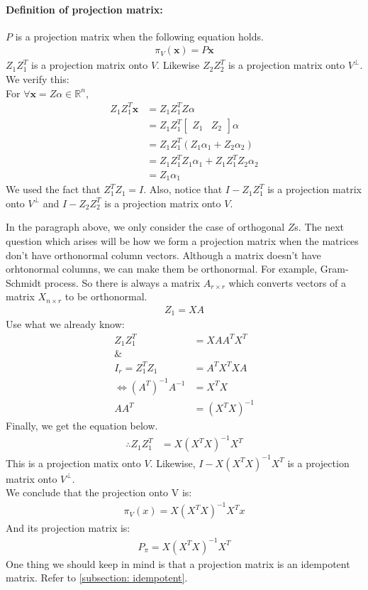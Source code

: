 \documentclass{article}
\begin{document}
\paragraph{Definition of projection matrix:} \(P\) is a projection matrix when the following equation holds. 
\begin{align*}
\pi_V(\mathbf{x})=P\mathbf{x}
\end{align*}
\(Z_1Z_1^T\) is a projection matrix onto \(V\). Likewise \(Z_2Z_2^T\) is a projection matrix onto \(V^\perp\). We verify this:\\
For \(\forall \mathbf{x} = Z\alpha \in \mathbb{R}^n\),
\begin{align*}
Z_1Z_1^T\mathbf{x}&=Z_1Z_1^TZ\alpha\\
&=Z_1Z_1^T\left[\begin{matrix}Z_1 & Z_2\end{matrix}\right]\alpha\\
&=Z_1Z_1^T\left(Z_1\alpha_1+ Z_2\alpha_2\right)\\
&=Z_1Z_1^TZ_1\alpha_1 + Z_1Z_1^TZ_2\alpha_2\\
&=Z_1\alpha_1
\end{align*}
We used the fact that \(Z_1^TZ_1=I\). Also, notice that \(I-Z_1Z_1^T\) is a projection matrix onto \(V^\perp\) and \(I-Z_2Z_2^T\) is a projection matrix onto \(V\).

In the paragraph above, we only consider the case of orthogonal \(Z\)s. The next question which arises will be how we form a projection matrix when the matrices don't have orthonormal column vectors. Although a matrix doesn't have orhtonormal columns, we can make them be orthonormal. For example, Gram-Schmidt process. So there is always a matrix \(A_{r\times r}\) which converts vectors of a matrix \(X_{n \times r}\) to be orthonormal.
\begin{align*}
Z_1 = XA
\end{align*}
Use what we already know:
\begin{align*}
Z_1 Z_1^T&=XA A^T X^T\\
\&\\
I_r = Z_1^TZ_1 &= A^TX^TXA\\
\iff (A^T)^{-1}A^{-1}&=X^TX\\
AA^T&=(X^TX)^{-1}
\end{align*}
Finally, we get the equation below.
\begin{align*}
\therefore Z_1Z_1^T&=X(X^TX)^{-1}X^T
\end{align*}
This is a projection matix onto \(V\). Likewise, \(I-X(X^TX)^{-1}X^T\) is a projection matrix onto \(V^\perp\).\\
We conclude that the projection onto V is:
\begin{align*}
\pi_V(x)=X(X^TX)^{-1}X^Tx
\end{align*}
And its projection matrix is:
\begin{align*}
P_\pi=X(X^TX)^{-1}X^T
\end{align*}
One thing we should keep in mind is that a projection matrix is an idempotent matrix. Refer to \ref{subsection: idempotent}.
\end{document}
